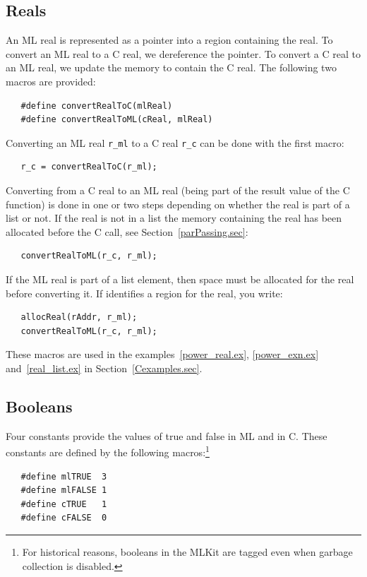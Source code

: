 \documentclass[12pt]{book}
\begin{document}
\subsection{Reals}
An ML real is represented as a pointer into a region containing the
real. To convert an ML real to a C real, we dereference the pointer. To
convert a C real to an ML real, we update the memory to contain the C
real. The following two macros are provided:
%
%
\begin{verbatim}
   #define convertRealToC(mlReal)
   #define convertRealToML(cReal, mlReal)
\end{verbatim}

Converting an ML real \verb|r_ml| to a C real \verb|r_c| can be done with the first macro:
\begin{verbatim}
   r_c = convertRealToC(r_ml);
\end{verbatim}

Converting from a C real to an ML real (being part of the result value of the
C function) is done in one or two steps depending on whether the real is
part of a list or not. If the real is not in a list the memory containing
the real has been allocated before the C call, see Section~\ref{parPassing.sec}:
\begin{verbatim}
   convertRealToML(r_c, r_ml);
\end{verbatim}
If the ML real is part of a list element, then space must be allocated for
the real before converting it. If  identifies a region
for the real, you write:
%
\begin{verbatim}
   allocReal(rAddr, r_ml);
   convertRealToML(r_c, r_ml);
\end{verbatim}

These macros are used in the examples~\ref{power_real.ex},
\ref{power_exn.ex} and~\ref{real_list.ex} in
Section~\ref{Cexamples.sec}.

\subsection{Booleans}
Four constants provide the values of true and false in ML and in C.
These constants are defined by the following macros:\footnote{For
  historical reasons, booleans in the MLKit are tagged even when garbage
  collection is disabled.}
%
%
%
%
\begin{verbatim}
   #define mlTRUE  3
   #define mlFALSE 1
   #define cTRUE   1
   #define cFALSE  0
\end{verbatim}
\end{document}
